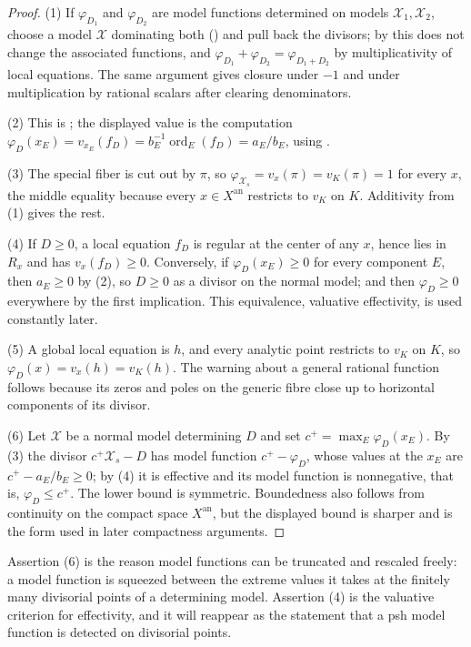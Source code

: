 \begin{proof}
(1) If $\varphi_{D_1}$ and $\varphi_{D_2}$ are model functions determined
on models $\mathcal X_1,\mathcal X_2$, choose a model $\mathcal X$
dominating both () and pull back the divisors;
by  this does not change the
associated functions, and $\varphi_{D_1}+\varphi_{D_2}=\varphi_{D_1+D_2}$
by multiplicativity of local equations. The same argument gives closure
under $-1$ and under multiplication by rational scalars after clearing
denominators.

(2) This is ; the
displayed value is the computation $\varphi_D(x_E)=v_{x_E}(f_D)=
b_E^{-1}\operatorname{ord}_E(f_D)=a_E/b_E$, using
.

(3) The special fiber is cut out by $\pi$, so $\varphi_{\mathcal X_s}
=v_x(\pi)=v_K(\pi)=1$ for every $x$, the middle equality because every
$x\in X^{\mathrm{an}}$ restricts to $v_K$ on $K$. Additivity from (1)
gives the rest.

(4) If $D\ge0$, a local equation $f_D$ is regular at the center of any
$x$, hence lies in $R_x$ and has $v_x(f_D)\ge0$. Conversely, if
$\varphi_D(x_E)\ge0$ for every component $E$, then $a_E\ge0$ by (2),
so $D\ge0$ as a divisor on the normal model; and then $\varphi_D\ge0$
everywhere by the first implication. This equivalence, valuative effectivity,
is used constantly later.

(5) A global local equation is $h$, and every analytic point restricts to
$v_K$ on $K$, so
$\varphi_D(x)=v_x(h)=v_K(h)$.  The warning about a general rational
function follows because its zeros and poles on the generic fibre close up
to horizontal components of its divisor.

(6) Let $\mathcal X$ be a normal model determining $D$ and set
$c^+=\max_E\varphi_D(x_E)$. By (3) the divisor
$c^+\mathcal X_s-D$ has model function $c^+-\varphi_D$, whose values at
the $x_E$ are $c^+-a_E/b_E\ge0$; by (4) it is effective and its model
function is nonnegative, that is, $\varphi_D\le c^+$. The lower bound is
symmetric. Boundedness also follows from continuity on the compact space
$X^{\mathrm{an}}$, but the displayed bound is sharper and is the form used
in later compactness arguments.
\end{proof}

Assertion (6) is the reason model functions can be truncated and rescaled
freely: a model function is squeezed between the extreme values it takes at
the finitely many divisorial points of a determining model. Assertion (4)
is the valuative criterion for effectivity, and it will reappear as the
statement that a psh model function is detected on divisorial points.

